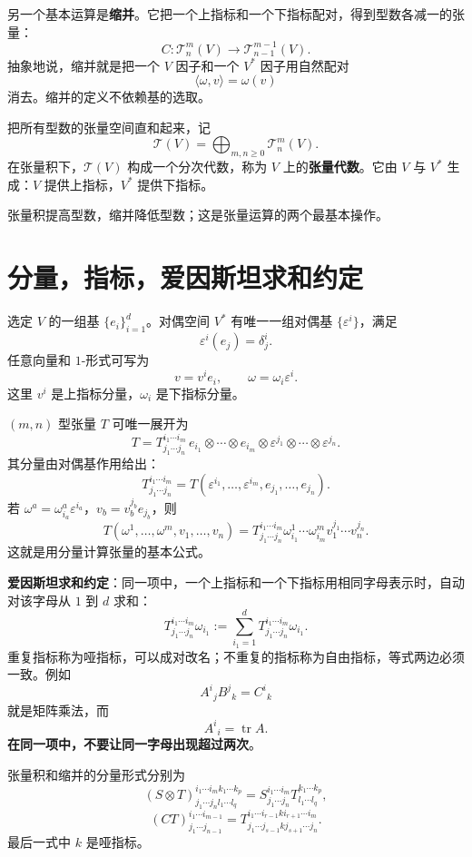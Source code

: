 \documentclass[UTF8,11pt,a4paper,fontset=fandol]{ctexart}
\numberwithin{equation}{section}
\newcommand{\eps}{\varepsilon}
\newcommand{\Tspace}[2]{\mathcal T^{#1}_{#2}(V)}
\DeclareMathOperator{\tr}{tr}
\begin{document}
另一个基本运算是\textbf{缩并}。它把一个上指标和一个下指标配对，得到型数各减一的张量：
\[
C:\Tspace{m}{n}\longrightarrow \Tspace{m-1}{n-1}.
\]
抽象地说，缩并就是把一个 $V$ 因子和一个 $V^*$ 因子用自然配对
\[
\langle \omega,v\rangle=\omega(v)
\]
消去。缩并的定义不依赖基的选取。

把所有型数的张量空间直和起来，记
\[
\mathcal T(V)=\bigoplus_{m,n\ge 0}\Tspace{m}{n}.
\]
在张量积下，$\mathcal T(V)$ 构成一个分次代数，称为 $V$ 上的\textbf{张量代数}。它由 $V$ 与 $V^*$ 生成：$V$ 提供上指标，$V^*$ 提供下指标。

张量积提高型数，缩并降低型数；这是张量运算的两个最基本操作。

\section{分量，指标，爱因斯坦求和约定}

选定 $V$ 的一组基 $\{e_i\}_{i=1}^d$。对偶空间 $V^*$ 有唯一一组对偶基 $\{\eps^i\}$，满足
\[
\eps^i(e_j)=\delta^i_j.
\]
任意向量和 $1$-形式可写为
\[
v=v^i e_i,\qquad \omega=\omega_i\eps^i.
\]
这里 $v^i$ 是上指标分量，$\omega_i$ 是下指标分量。

$(m,n)$ 型张量 $T$ 可唯一展开为
\begin{equation}
T=T^{i_1\cdots i_m}_{j_1\cdots j_n}\,
e_{i_1}\otimes\cdots\otimes e_{i_m}\otimes
\eps^{j_1}\otimes\cdots\otimes \eps^{j_n}.
\end{equation}
其分量由对偶基作用给出：
\begin{equation}
T^{i_1\cdots i_m}_{j_1\cdots j_n}
=
T(\eps^{i_1},\ldots,\eps^{i_m},e_{j_1},\ldots,e_{j_n}).
\end{equation}
若 $\omega^a=\omega^a_{i_a}\eps^{i_a}$，$v_b=v_b^{j_b}e_{j_b}$，则
\begin{equation}
T(\omega^1,\ldots,\omega^m,v_1,\ldots,v_n)
=
T^{i_1\cdots i_m}_{j_1\cdots j_n}
\omega^1_{i_1}\cdots \omega^m_{i_m}
v_1^{j_1}\cdots v_n^{j_n}.
\end{equation}
这就是用分量计算张量的基本公式。

\textbf{爱因斯坦求和约定}：同一项中，一个上指标和一个下指标用相同字母表示时，自动对该字母从 $1$ 到 $d$ 求和：
\[
T^{i_1\cdots i_m}_{j_1\cdots j_n}\omega_{i_1}
:=
\sum_{i_1=1}^d T^{i_1\cdots i_m}_{j_1\cdots j_n}\omega_{i_1}.
\]
重复指标称为哑指标，可以成对改名；不重复的指标称为自由指标，等式两边必须一致。例如
\[
A^i{}_j B^j{}_k=C^i{}_k
\]
就是矩阵乘法，而
\[
A^i{}_i=\tr A.
\]
\textbf{在同一项中，不要让同一字母出现超过两次}。

张量积和缩并的分量形式分别为
\[
(S\otimes T)^{i_1\cdots i_m k_1\cdots k_p}_{j_1\cdots j_n l_1\cdots l_q}
=
S^{i_1\cdots i_m}_{j_1\cdots j_n}
T^{k_1\cdots k_p}_{l_1\cdots l_q},
\]
\[
(C T)^{i_1\cdots i_{m-1}}_{j_1\cdots j_{n-1}}
=
T^{i_1\cdots i_{r-1} k i_{r+1}\cdots i_m}_{j_1\cdots j_{s-1} k j_{s+1}\cdots j_n}.
\]
最后一式中 $k$ 是哑指标。
\end{document}
